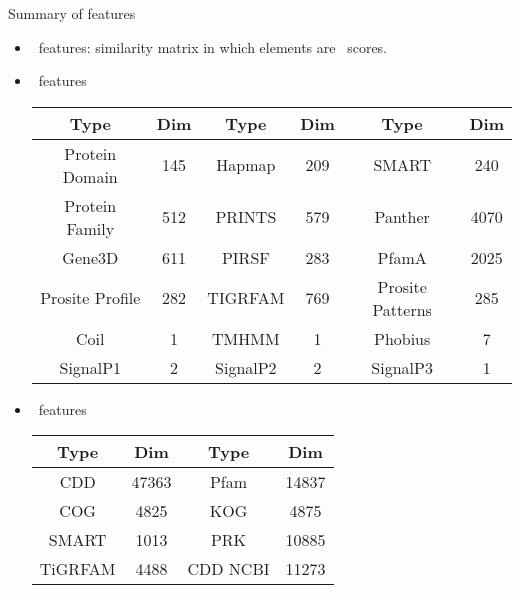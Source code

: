 \documentclass[first=dgreen,second=purple,logo=yellowexc]{aaltoslides}
\begin{document}
\begin{frame}{Summary of features}
	\begin{itemize}
		\item \blast\ features: similarity matrix in which elements are \blast\ scores.
		\item \interproscan\ features\\
		{\scriptsize\begin{tabular}{|c|c||c|c||c|c|}\hline
		 Type & Dim & Type & Dim & Type & Dim  \\ \hline
		 Protein Domain & 145 & Hapmap & 209 & SMART & 240 \\
		 Protein Family & 512 & PRINTS & 579 & Panther & 4070 \\
		 Gene3D & 611 & PIRSF & 283 & PfamA & 2025 \\
		 Prosite Profile & 282  & TIGRFAM & 769 & Prosite Patterns & 285\\
		 Coil & 1 & TMHMM& 1& Phobius &7 \\
		 SignalP1& 2& SignalP2 & 2 & SignalP3 & 1\\\hline
		\end{tabular}}
		\item \pssm\ features\\
		{\scriptsize\begin{tabular}{|c|c||c|c|}\hline
		 Type & Dim & Type & Dim \\ \hline
		 CDD & 47363 & Pfam & 14837\\
		 COG & 4825  & KOG  & 4875 \\
		 SMART & 1013 & PRK & 10885 \\
		 TiGRFAM & 4488  & CDD NCBI & 11273\\ \hline
		\end{tabular}}
	\end{itemize}
\end{frame}
\end{document}
